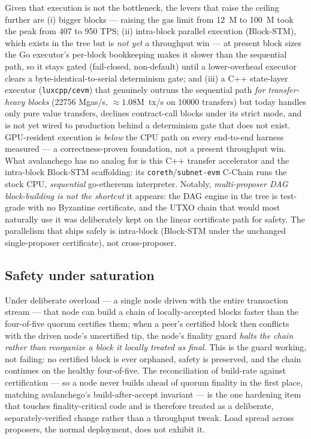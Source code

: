 Given that execution is not the bottleneck, the levers that raise the
ceiling further are (i) bigger blocks --- raising the gas limit from
\SI{12}{M} to \SI{100}{M} took the peak from \SI{407}{} to \SI{950}{}
TPS; (ii) intra-block parallel execution (Block-STM), which exists in the
tree but is \emph{not yet} a throughput win --- at present block sizes the
Go executor's per-block bookkeeping makes it slower than the sequential
path, so it stays gated (fail-closed, non-default) until a lower-overhead
executor clears a byte-identical-to-serial determinism gate; and (iii) a
C++ state-layer executor (\texttt{luxcpp/cevm}) that genuinely outruns the
sequential path \emph{for transfer-heavy blocks} (\SI{22756}{} Mgas/s,
$\approx\!\num{1.08}$M~tx/s on \num{10000} transfers) but today handles
only pure value transfers, declines contract-call blocks under its strict
mode, and is not yet wired to production behind a determinism gate that
does not exist. GPU-resident execution is \emph{below} the CPU path on
every end-to-end harness measured --- a correctness-proven foundation, not
a present throughput win. What avalanchego has no analog for is this C++
transfer accelerator and the intra-block Block-STM scaffolding: its
\texttt{coreth}/\texttt{subnet-evm} C-Chain runs the stock CPU,
\emph{sequential} go-ethereum interpreter. Notably, \emph{multi-proposer DAG block-building is not the
shortcut} it appears: the DAG engine in the tree is test-grade with no
Byzantine certificate, and the UTXO chain that would most naturally use it
was deliberately kept on the linear certificate path for safety. The
parallelism that ships safely is intra-block (Block-STM under the
unchanged single-proposer certificate), not cross-proposer.

\subsection{Safety under saturation}

Under deliberate overload --- a single node driven with the entire
transaction stream --- that node can build a chain of locally-accepted
blocks faster than the four-of-five quorum certifies them; when a peer's
certified block then conflicts with the driven node's uncertified tip,
the node's finality guard \emph{halts the chain rather than reorganize a
block it locally treated as final}. This is the guard working, not
failing: no certified block is ever orphaned, safety is preserved, and
the chain continues on the healthy four-of-five. The reconciliation of
build-rate against certification --- so a node never builds ahead of
quorum finality in the first place, matching avalanchego's
build-after-accept invariant --- is the one hardening item that touches
finality-critical code and is therefore treated as a deliberate,
separately-verified change rather than a throughput tweak. Load spread
across proposers, the normal deployment, does not exhibit it.

